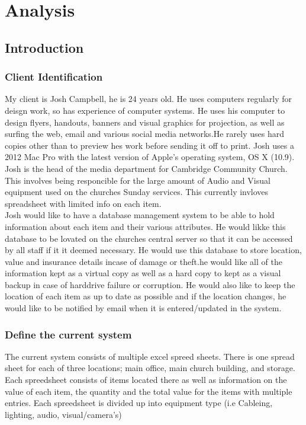 \chapter{Analysis}

\section{Introduction}

\subsection{Client Identification}

My client is Josh Campbell, he is 24 years old. He uses computers regularly for deisgn work, so has experience of computer systems. He uses his computer to design flyers, handouts, banners and visual graphics for projection, as well as surfing the web, email and various social media networks.He rarely uses hard copies other than to preview hes work before sending it off to print. Josh uses a 2012 Mac Pro with the latest version of Apple's operating system, OS X (10.9).\\

\noindent Josh is the head of the media department for Cambridge Community Church. This involves being responcible for the large amount of Audio and Visual equipment used on the churches Sunday services. This currently invloves spreadsheet with limited info on each item. \\

\noindent Josh would like to have a database management system to be able to hold information about each item and their various attributes. He would likke this database to be lovated on the churches central server so that it can be accessed by all staff if it it deemed necessary. He would use this database to store location, value and insurance details incase of damage or theft.he would like all of the information kept as a virtual copy as well as a hard copy to kept as a visual backup in case of harddrive failure or corruption. He would also like to keep the location of each item as up to date as possible and if the location changes, he would like to be notified by email when it is entered/updated in the system.

\subsection{Define the current system}

The current system consists of multiple excel spreed sheets. There is one spread sheet for each of three locations; main office, main church building, and storage. Each spreedsheet consists of items located there as well as information on the value of each item, the quantity and the total value for the items with multiple entries. Each spreedsheet is divided up into equipment type (i.e Cableing, lighting, audio, visual/camera's) 

